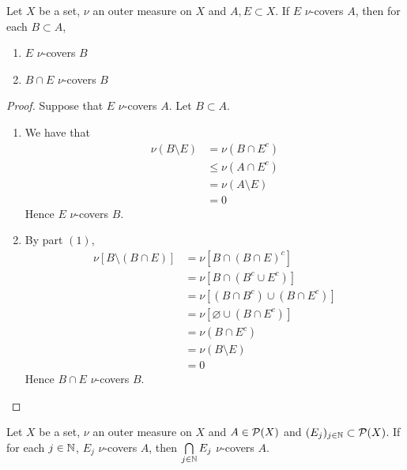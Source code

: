 \documentclass{book}
\begin{document}
	
	\begin{ex}   
		Let $X$ be a set, $\nu$ an outer measure on $X$ and $A, E \subset X$. If $E$ $\nu$-covers $A$, then for each $B \subset A$,
		\begin{enumerate}
			\item $E$ $\nu$-covers $B$
			\item $B \cap E$ $\nu$-covers $B$
		\end{enumerate}
	\end{ex}

	\begin{proof} Suppose that $E$ $\nu$-covers $A$. Let $B \subset A$.
		\begin{enumerate}
			\item We have that
			\begin{align*}
				\nu(B \setminus E)
				& = \nu(B \cap E^c) \\
				& \leq \nu(A \cap E^c) \\
				& = \nu(A \setminus E) \\
				& = 0
			\end{align*}
			Hence $E$ $\nu$-covers $B$.
			\item By part $(1)$, 
			\begin{align*}
				\nu[B \setminus (B \cap E)]
				& = \nu[B \cap (B \cap E)^c] \\
				& = \nu[ B \cap (B^c \cup E^c)] \\
				& = \nu[ (B \cap B^c) \cup (B \cap E^c)] \\
				& = \nu[\varnothing \cup (B \cap E^c)] \\
				& = \nu(B \cap E^c) \\
				& = \nu(B \setminus E) \\
				& = 0
			\end{align*}
			Hence $B \cap E$ $\nu$-covers $B$.
		\end{enumerate}
	\end{proof}
	
	\begin{ex} 
		Let $X$ be a set, $\nu$ an outer measure on $X$ and $A \in \mathcal{P}(X)$ and $(E_j)_{j \in \mathbb{N}} \subset \mathcal{P}(X)$. If for each $j \in \mathbb{N}$, $E_j$ $\nu$-covers $A$, then $\bigcap\limits_{j \in \mathbb{N}} E_j$ $\nu$-covers $A$.
	\end{ex}
\end{document}
